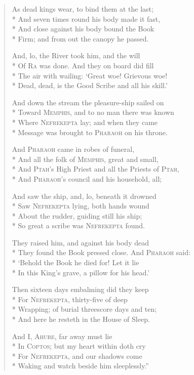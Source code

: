 \documentclass[12pt]{article}
\newcommand{\vin}{\hspace{1em}}
\begin{document}
\begin{verse}
As dead kings wear, to bind them at the last;\\*
And seven times round his body made it fast,\\*
\vin And close against his body bound the Book\\*
Firm; and from out the canopy he passed.

And, lo, the River took him, and the will\\*
Of \textsc{Ra} was done. And they on board did fill\\*
\vin The air with wailing: `Great woe! Grievous woe!\\*
Dead, dead, is the Good Scribe and all his skill.'

And down the stream the pleasure-ship sailed on\\*
Toward \textsc{Memphis}, and to no man there was known\\*
\vin Where \textsc{Nefrekepta} lay; and when they came\\*
Message was brought to \textsc{Pharaoh} on his throne.

And \textsc{Pharaoh} came in robes of funeral,\\*
And all the folk of \textsc{Memphis}, great and small,\\*
\vin And \textsc{Ptah}'s High Priest and all the Priests of \textsc{Ptah},\\*
And \textsc{Pharaoh}'s council and his household, all;

And saw the ship, and, lo, beneath it drowned\\*
Saw \textsc{Nefrekepta} lying, both hands wound\\*
\vin About the rudder, guiding still his ship;\\*
So great a scribe was \textsc{Nefrekepta} found.

They raised him, and against his body dead\\*
They found the Book pressed close. And \textsc{Pharaoh} said:\\*
\vin `Behold the Book he died for! Let it lie\\*
In this King's grave, a pillow for his head.'

Then sixteen days embalming did they keep\\*
For \textsc{Nefrekepta}, thirty-five of deep\\*
\vin Wrapping; of burial threescore days and ten;\\*
And here he resteth in the House of Sleep.

And I, \textsc{Ahure}, far away must lie\\*
In \textsc{Coptos}; but my heart within doth cry\\*
\vin For \textsc{Nefrekepta}, and our shadows come\\*
Waking and watch beside him sleeplessly.''
\end{verse}
\end{document}
